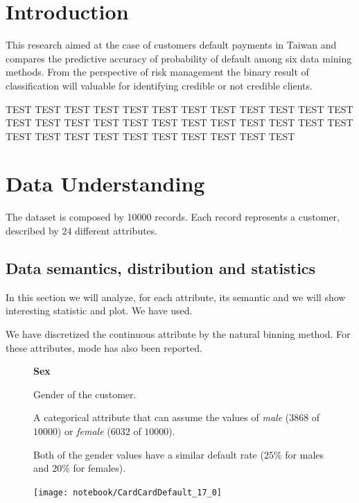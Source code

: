 \documentclass[11pt,a4paper]{report}
\begin{document}
\tableofcontents


\chapter{Introduction}


This research aimed at the case of customers default payments in Taiwan and compares the predictive accuracy of probability of default among six data mining methods. From the perspective of risk management the binary result of classification will valuable for identifying credible or not credible clients.


TEST TEST TEST TEST TEST TEST TEST TEST TEST TEST TEST TEST TEST TEST TEST TEST TEST TEST TEST TEST TEST TEST TEST TEST TEST TEST TEST TEST TEST TEST TEST TEST TEST TEST 

\chapter{Data Understanding}

The dataset is composed by 10000 records. Each record represents a customer, described by $24$ different attributes.

\section{Data semantics, distribution and statistics}

In this section we will analyze, for each attribute, its semantic and we will show interesting statistic and plot.
We have used.

We have discretized the continuous attribute by the natural binning method. For these attributes, mode has also been reported.

\smallskip
\begin{figure}[h]
  \begin{minipage}[h]{.50\textwidth}
        {\Large \textbf{Sex}}
        
        Gender of the customer.
        
        A categorical attribute that can assume the values of \textit{male} ($3868$ of $10000$) or \textit{female} ($6032$ of $10000$). 
        
        Both of the gender values have a similar default rate ($25\%$ for males and $20\%$ for females).
  \end{minipage}
  \begin{minipage}[h]{.50\textwidth}
	  \texttt{[image: notebook/CardCardDefault\_17\_0]}
  \end{minipage}
\end{figure}
\end{document}
